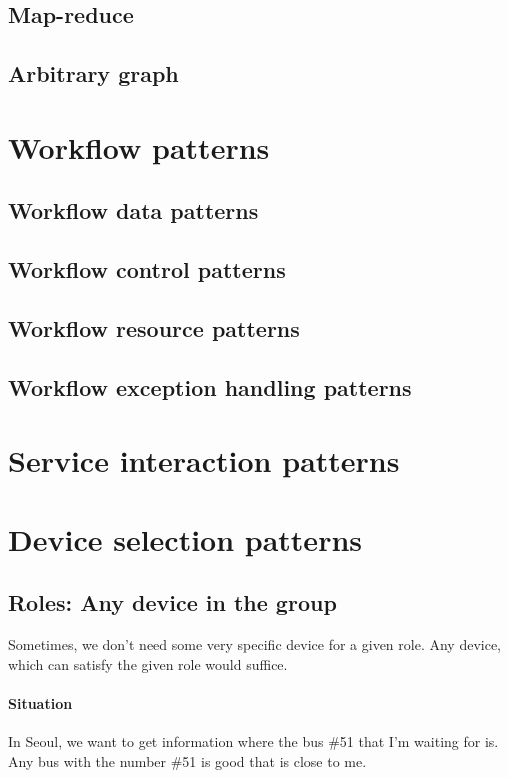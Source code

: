 \documentclass{note}
\begin{document}
\subsection{Map-reduce}
\subsection{Arbitrary graph}

\section{Workflow patterns}
\subsection{Workflow data patterns} 
\subsection{Workflow control patterns} 
\subsection{Workflow resource patterns} 
\subsection{Workflow exception handling patterns} 


\section{Service interaction patterns}

\section{Device selection patterns}
\subsection{Roles: Any device in the group}
Sometimes, we don't need some very specific device for a given role.
Any device, which can satisfy the given role would suffice. 

\paragraph{Situation} In Seoul, we want to get information where the bus \#51
that I'm waiting for is. Any bus with the number \#51 is good that is close to
me. 
\end{document}
